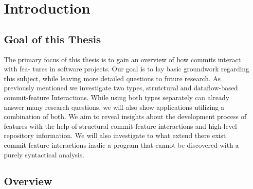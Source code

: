 \section*{Introduction}\label{ch:introduction}

\subsection*{Goal of this Thesis}

The primary focus of this thesis is to gain an overview of how commits interact with fea-
tures in software projects. Our goal is to lay basic groundwork regarding this
subject, while leaving more detailed questions to future research. As previously mentioned
we investigate two types, strutctural and dataflow-based commit-feature Interactions. While
using both types separately can already answer many research questions, we will also show
applications utilizing a combination of both.
We aim to reveal insights about the development process of features with the help of 
structural commit-feature interactions and high-level repository information.
We will also investigate to what extend there exist commit-feature interactions 
insdie a program that cannot be discovered with a purely syntactical analysis.

\subsection*{Overview}

